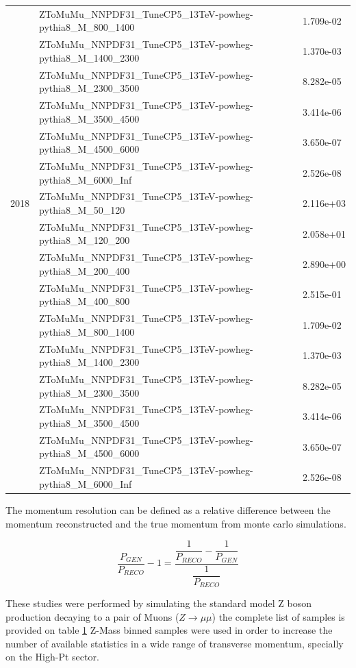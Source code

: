 \begin{table}
\begin{center}
\begin{tabular}{|l|l|l|}
&ZToMuMu\_NNPDF31\_TuneCP5\_13TeV-powheg-pythia8\_M\_800\_1400 & 1.709e-02\\
&ZToMuMu\_NNPDF31\_TuneCP5\_13TeV-powheg-pythia8\_M\_1400\_2300 & 1.370e-03\\
&ZToMuMu\_NNPDF31\_TuneCP5\_13TeV-powheg-pythia8\_M\_2300\_3500 & 8.282e-05\\
&ZToMuMu\_NNPDF31\_TuneCP5\_13TeV-powheg-pythia8\_M\_3500\_4500 & 3.414e-06\\
&ZToMuMu\_NNPDF31\_TuneCP5\_13TeV-powheg-pythia8\_M\_4500\_6000 & 3.650e-07\\
&ZToMuMu\_NNPDF31\_TuneCP5\_13TeV-powheg-pythia8\_M\_6000\_Inf & 2.526e-08\\
\hline
2018 & ZToMuMu\_NNPDF31\_TuneCP5\_13TeV-powheg-pythia8\_M\_50\_120 & 2.116e+03\\
&ZToMuMu\_NNPDF31\_TuneCP5\_13TeV-powheg-pythia8\_M\_120\_200 & 2.058e+01\\
&ZToMuMu\_NNPDF31\_TuneCP5\_13TeV-powheg-pythia8\_M\_200\_400 & 2.890e+00\\
&ZToMuMu\_NNPDF31\_TuneCP5\_13TeV-powheg-pythia8\_M\_400\_800 & 2.515e-01\\
&ZToMuMu\_NNPDF31\_TuneCP5\_13TeV-powheg-pythia8\_M\_800\_1400 & 1.709e-02\\
&ZToMuMu\_NNPDF31\_TuneCP5\_13TeV-powheg-pythia8\_M\_1400\_2300 & 1.370e-03\\
&ZToMuMu\_NNPDF31\_TuneCP5\_13TeV-powheg-pythia8\_M\_2300\_3500 & 8.282e-05\\
&ZToMuMu\_NNPDF31\_TuneCP5\_13TeV-powheg-pythia8\_M\_3500\_4500 & 3.414e-06\\
&ZToMuMu\_NNPDF31\_TuneCP5\_13TeV-powheg-pythia8\_M\_4500\_6000 & 3.650e-07\\
&ZToMuMu\_NNPDF31\_TuneCP5\_13TeV-powheg-pythia8\_M\_6000\_Inf & 2.526e-08\\
\hline
\end{tabular}
\label{tab:MomentumResolutionSamples}
\end{center}
\end{table}

The momentum resolution can be defined as a relative difference between the
momentum reconstructed and the true momentum from monte carlo simulations.

\begin{equation}
\frac{P_{GEN}}{P_{RECO}} - 1 = \frac{\dfrac{1}{P_{RECO}}-\dfrac{1}{P_{GEN}}}{\dfrac{1}{P_{RECO}}}
\end{equation}

These studies were performed by simulating the standard model Z boson production
decaying to a pair of Muons ($Z\rightarrow\mu\mu$) the complete list of samples is
provided on table \ref{tab:MomentumResolutionSamples}
Z-Mass binned samples were used in order to increase the number of available
statistics in a wide range of transverse momentum, specially on the High-Pt sector.

